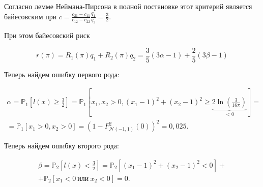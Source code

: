 \documentclass[14pt]{extarticle}
\begin{document}
Согласно лемме Неймана-Пирсона в полной постановке этот критерий является байесовским при $c = \frac{c_{21} - c_{11}}{c_{12} - c_{22}}\frac{q_1}{q_2} = \frac{3}{2}$.

При этом байесовский риск

\begin{equation*}
    r(\pi) = R_1(\pi)q_1 + R_2(\pi)q_2 = \frac{3}{5}(3\alpha - 1) + \frac{2}{5}(3\beta - 1)
\end{equation*}

Теперь найдем ошибку первого рода:

\begin{gather*}
    \alpha = \mathbb P_1\left[l(x)\geqslant\frac{3}{2}\right] = \mathbb P_1\left[x_1, x_2 > 0, (x_1 - 1)^2 + (x_2 - 1)^2 \geqslant \underbrace{2\ln(\frac{3}{16\pi})}_{ < 0}\right] =\\
    =\mathbb P_1 [x_1 > 0, x_2 > 0] = (1 - F_{\mathcal{N}(-1, 1)}^2 (0))^2 = 0,025.
\end{gather*}

Теперь найдем ошибку второго рода: 

\begin{gather*}
    \beta = \mathbb P_2\left[l(x) < \frac{3}{2}\right] = \mathbb P_2\left[(x_1 - 1)^2 + (x_2 - 1)^2 < 0\right]+\\
    + \mathbb P_2\left[x_1 < 0 ~\text{или}~ x_2 < 0\right] = 0.
\end{gather*}
\end{document}
